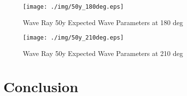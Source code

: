 \begin{figure}[H]
\centering
\texttt{[image: ./img/50y\_180deg.eps]}
\caption{Wave Ray 50y Expected Wave Parameters at 180 deg}
\label{fig:prob4WHvWD}
\end{figure}

\begin{figure}[H]
\centering
\texttt{[image: ./img/50y\_210deg.eps]}
\caption{Wave Ray 50y Expected Wave Parameters at 210 deg}
\label{fig:prob4WHvWD}
\end{figure}

\section{Conclusion}
